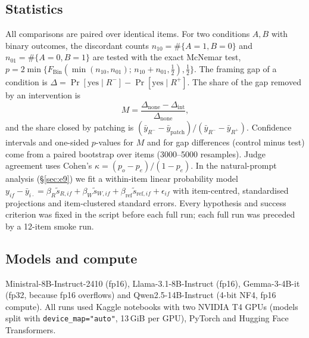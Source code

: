 \documentclass[10pt]{article}
\begin{document}
\subsection{Statistics}
All comparisons are paired over identical items. For two conditions $A,B$ with binary outcomes, the discordant counts
$n_{10}=\#\{A{=}1,B{=}0\}$ and $n_{01}=\#\{A{=}0,B{=}1\}$ are tested with the exact McNemar test,
$p=2\min\{F_{\mathrm{Bin}}(\min(n_{10},n_{01});\,n_{10}{+}n_{01},\tfrac12),\tfrac12\}$.
The framing gap of a condition is $\Delta=\Pr[\text{yes}\mid R^{-}]-\Pr[\text{yes}\mid R^{+}]$. The share of the gap removed by an intervention is
\begin{equation}
M=\frac{\Delta_{\mathrm{none}}-\Delta_{\mathrm{int}}}{\Delta_{\mathrm{none}}},
\end{equation}
and the share closed by patching is $(\bar y_{R^-}-\bar y_{\mathrm{patch}})/(\bar y_{R^-}-\bar y_{R^+})$. Confidence intervals and one-sided
$p$-values for $M$ and for gap differences (control minus test) come from a paired bootstrap over items (3000--5000 resamples).
Judge agreement uses Cohen's $\kappa=(p_o-p_e)/(1-p_e)$. In the natural-prompt analysis (\S\ref{sec:e9}) we fit a within-item linear probability model
$y_{if}-\bar y_{i\cdot}=\beta_R\tilde s_{R,if}+\beta_W\tilde s_{W,if}+\beta_{\mathrm{ref}}\tilde s_{\mathrm{ref},if}+\epsilon_{if}$
with item-centred, standardised projections and item-clustered standard errors. Every hypothesis and success criterion was fixed in the script before each full run; each full run was preceded by a 12-item smoke run.

\subsection{Models and compute}
Ministral-8B-Instruct-2410 (fp16), Llama-3.1-8B-Instruct (fp16), Gemma-3-4B-it (fp32, because fp16 overflows) and Qwen2.5-14B-Instruct
(4-bit NF4, fp16 compute). All runs used Kaggle notebooks with two NVIDIA T4 GPUs (models split with \texttt{device\_map="auto"},
13\,GiB per GPU), PyTorch and Hugging Face Transformers.

\end{document}
